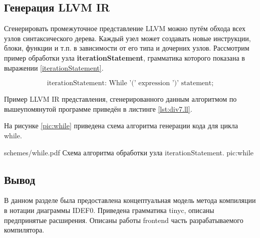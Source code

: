 \subsection{Генерация LLVM IR}
Сгенерировать промежуточное представление LLVM можно путём обхода всех узлов синтаксического дерева. Каждый узел может создавать новые инструкции, блоки, функции и т.п. в зависимости от его типа и дочерних узлов. Рассмотрим пример обработки узла \textbf{iterationStatement}, грамматика которого показана в выражении \ref{iterationStatement}.

\begin{equation}
    \label{iterationStatement}
    \text{iterationStatement: While '(' expression ')' statement;}
\end{equation}

Пример LLVM IR представления, сгенерированного данным алгоритмом по вышеупомянутой программе приведён в листинге \ref{lst:div7.ll}.

\label{lst:div7.ll}

На рисунке \ref{pic:while} приведена схема алгоритма генерации кода для цикла while.

\myImage
{schemes/while.pdf}
{Схема алгоритма обработки узла iterationStatement.}
{pic:while}

\subsection*{Вывод}
В данном разделе была предоставлена концептуальная модель метода компиляции в нотации диаграммы IDEF0. Приведена грамматика tinyc, описаны предпринятые расширения. Описаны работы frontend часть разрабатываемого компилятора.

\pagebreak
